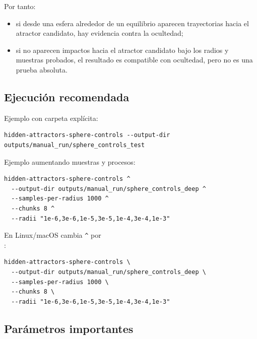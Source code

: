 \documentclass[11pt,letterpaper]{article}
\begin{document}
Por tanto:

\begin{itemize}
  \item si desde una esfera alrededor de un equilibrio aparecen trayectorias hacia el atractor candidato, hay evidencia contra la ocultedad;
  \item si no aparecen impactos hacia el atractor candidato bajo los radios y muestras probados, el resultado es compatible con ocultedad, pero no es una prueba absoluta.
\end{itemize}

\subsection{Ejecución recomendada}

Ejemplo con carpeta explícita:

\begin{lstlisting}[style=terminal]
hidden-attractors-sphere-controls --output-dir outputs/manual_run/sphere_controls_test
\end{lstlisting}

Ejemplo aumentando muestras y procesos:

\begin{lstlisting}[style=terminal]
hidden-attractors-sphere-controls ^
  --output-dir outputs/manual_run/sphere_controls_deep ^
  --samples-per-radius 1000 ^
  --chunks 8 ^
  --radii "1e-6,3e-6,1e-5,3e-5,1e-4,3e-4,1e-3"
\end{lstlisting}

En Linux/macOS cambia \texttt{\^{}} por \texttt{\\}:

\begin{lstlisting}[style=terminal]
hidden-attractors-sphere-controls \
  --output-dir outputs/manual_run/sphere_controls_deep \
  --samples-per-radius 1000 \
  --chunks 8 \
  --radii "1e-6,3e-6,1e-5,3e-5,1e-4,3e-4,1e-3"
\end{lstlisting}

\subsection{Parámetros importantes}
\end{document}

